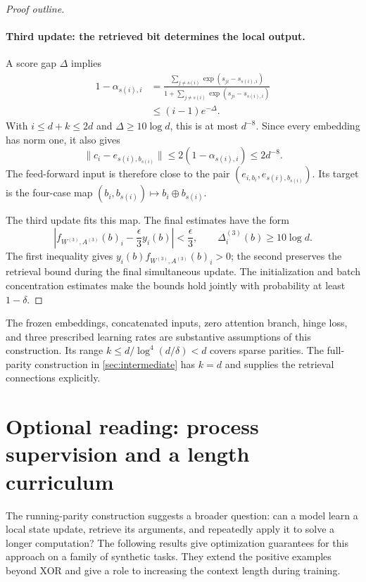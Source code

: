 \documentclass[11pt,twoside]{article}
\theoremstyle{definition}
\theoremstyle{remark}
\begin{document}
\begin{proof}[Proof outline]
\paragraph{Third update: the retrieved bit determines the local output.}
A score gap $\Delta$ implies
\begin{align*}
1-\alpha_{s(i),i}
&=\frac{\sum_{j\ne s(i)}\exp(s_{ji}-s_{s(i),i})}
 {1+\sum_{j\ne s(i)}\exp(s_{ji}-s_{s(i),i})}\\
&\le(i-1)e^{-\Delta}.
\end{align*}
With $i\le d+k\le2d$ and $\Delta\ge10\log d$, this is at most $d^{-8}$.
Since every embedding has norm one, it also gives
\[
\|c_i-e_{s(i),b_{s(i)}}\|
\le2(1-\alpha_{s(i),i})\le2d^{-8}.
\]
The feed-forward input is therefore close to the pair
$(e_{i,b_i},e_{s(i),b_{s(i)}})$. Its target is the four-case map
$(b_i,b_{s(i)})\mapsto b_i\oplus b_{s(i)}$.

The third update fits this map. The final estimates have the form
\[
\left|f_{W^{(3)},A^{(3)}}(b)_i-\frac{\epsilon}{3}y_i(b)\right|
<\frac{\epsilon}{3},
\qquad
\Delta_i^{(3)}(b)\ge10\log d.
\]
The first inequality gives $y_i(b)f_{W^{(3)},A^{(3)}}(b)_i>0$; the second
preserves the retrieval bound during the final simultaneous update.
The initialization and batch concentration estimates make the bounds hold
jointly with probability at least $1-\delta$.
\end{proof}

The frozen embeddings, concatenated inputs, zero attention branch, hinge
loss, and three prescribed learning rates are substantive assumptions of
this construction. Its range $k\le d/\log^4(d/\delta)<d$ covers sparse
parities. The full-parity construction in \cref{sec:intermediate} has
$k=d$ and supplies the retrieval connections explicitly.

\section{Optional reading: process supervision and a length curriculum}
\label{sec:state-tracking}

The running-parity construction suggests a broader question: can a model
learn a local state update, retrieve its arguments, and repeatedly apply it
to solve a longer computation? The following results give optimization
guarantees for this approach on a family of synthetic tasks. They extend
the positive examples beyond XOR and give a role to increasing the context
length during training.
\end{document}
